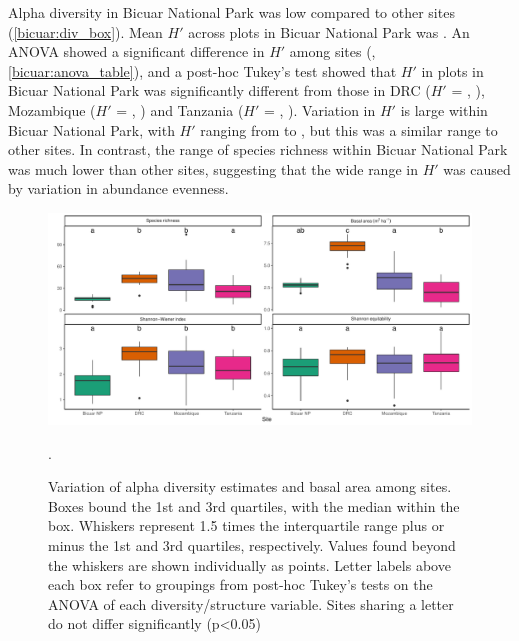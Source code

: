 \begin{refsection}
\begin{landscape}

\end{landscape}

Alpha diversity in Bicuar National Park was low compared to other sites (\autoref{bicuar:div_box}). Mean $H'$ across plots in Bicuar National Park was \bicuarshannon{}. An ANOVA showed a significant difference in $H'$ among sites (\lmshannon{}, \autoref{bicuar:anova_table}), and a post-hoc Tukey's test showed that $H'$ in plots in Bicuar National Park was significantly different from those in DRC ($H'$ = \drcshannon{}, \tukeyshannonbicuardrc{}), Mozambique ($H'$ = \nhamshannon{}, \tukeyshannonbicuarnham{}) and Tanzania ($H'$ = \kilwashannon{}, \tukeyshannonbicuarkilwa{}). Variation in $H'$ is large within Bicuar National Park, with $H'$ ranging from \bicuarminshannon{} to \bicuarmaxshannon{}, but this was a similar range to other sites. In contrast, the range of species richness within Bicuar National Park was much lower than other sites, suggesting that the wide range in $H'$ was caused by variation in abundance evenness.

\begin{figure}
	\includegraphics[width=\textwidth]{img/div_box}
	\caption[Alpha diversity of plots within each site]{Variation of alpha diversity estimates and basal area among sites. Boxes bound the 1st and 3rd quartiles, with the median within the box. Whiskers represent 1.5 times the interquartile range plus or minus the 1st and 3rd quartiles, respectively. Values found beyond the whiskers are shown individually as points. Letter labels above each box refer to groupings from post-hoc Tukey's tests on the ANOVA of each diversity/structure variable. Sites sharing a letter do not differ significantly (p<0.05)}.
    \label{bicuar:div_box}
\end{figure}

\begin{landscape}

\end{landscape}


\end{refsection}
